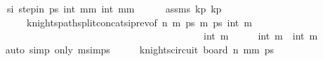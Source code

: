 \begin{isabellebody}
\ \ \ \ \ \ si{\isacharcolon}{\kern0pt}\ {\isachardoublequoteopen}step{\isacharunderscore}{\kern0pt}in\ ps\ {\isacharparenleft}{\kern0pt}{}{\isacharcomma}{\kern0pt}int\ {\isacharparenleft}{\kern0pt}mm\ {\isacharparenleft}{\kern0pt}{}{\isacharcomma}{\kern0pt}int\ {\isacharparenleft}{\kern0pt}mm\isanewline
\ \ \ \ \isamarkupfalse%
\ assms\ kp{}\ kp{}\ \isanewline
\ \ \ \ \ \ \ \ \ \ knights{\isacharunderscore}{\kern0pt}path{\isacharunderscore}{\kern0pt}split{\isacharunderscore}{\kern0pt}concat{\isacharunderscore}{\kern0pt}si{\isacharunderscore}{\kern0pt}prev{\isacharbrackleft}{\kern0pt}of\ n\ m\ ps\ m\ ps\ {\isachardoublequoteopen}{\isacharparenleft}{\kern0pt}{}{\isacharcomma}{\kern0pt}int\ m\ \isanewline
\ \ \ \ \ \ \ \ \ \ \ \ \ \ \ \ \ \ \ \ \ \ \ \ \ \ \ \ \ \ \ \ \ \ \ \ \ \ \ \ \ \ \ \ \ \ {\isachardoublequoteopen}{\isacharparenleft}{\kern0pt}{}{\isacharcomma}{\kern0pt}int\ m\ {}\ {}\ {}\ {}\ {}\ {\isachardoublequoteopen}int\ m\ {}\ {\isachardoublequoteopen}int\ m\ \isanewline
\ \ \ \ \isamarkupfalse%
\ {\isacharparenleft}{\kern0pt}auto\ simp\ only{\isacharcolon}{\kern0pt}\ m{\isacharunderscore}{\kern0pt}simps{\isacharparenright}{\kern0pt}\isanewline
\ \ \isamarkupfalse%
\ \isamarkupfalse%
\ {\isachardoublequoteopen}knights{\isacharunderscore}{\kern0pt}circuit\ {\isacharparenleft}{\kern0pt}board\ n\ {\isacharparenleft}{\kern0pt}mm\ ps{\isachardoublequoteclose}\isanewline
\ \ \ \ \isamarkupfalse%

\end{isabellebody}
